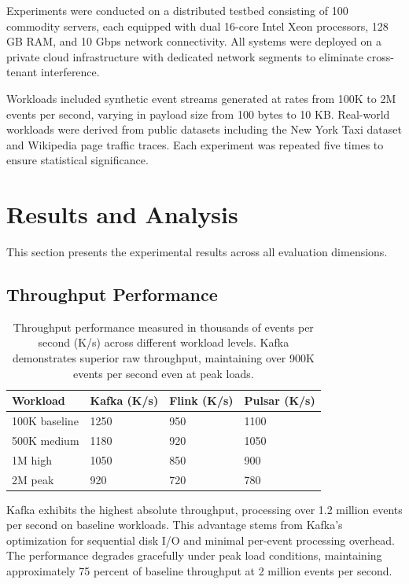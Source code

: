 \documentclass[10pt,twocolumn]{article}
\begin{document}
Experiments were conducted on a distributed testbed consisting of 100 commodity servers, each equipped with dual 16-core Intel Xeon processors, 128 GB RAM, and 10 Gbps network connectivity. All systems were deployed on a private cloud infrastructure with dedicated network segments to eliminate cross-tenant interference.

Workloads included synthetic event streams generated at rates from 100K to 2M events per second, varying in payload size from 100 bytes to 10 KB. Real-world workloads were derived from public datasets including the New York Taxi dataset and Wikipedia page traffic traces. Each experiment was repeated five times to ensure statistical significance.

\section{Results and Analysis}

This section presents the experimental results across all evaluation dimensions.

\subsection{Throughput Performance}

\begin{table}[h]
\centering
\small
\begin{tabularx}{\columnwidth}{|l|X|X|X|}
\toprule
\textbf{Workload} & \textbf{Kafka (K/s)} & \textbf{Flink (K/s)} & \textbf{Pulsar (K/s)} \\
\midrule
100K baseline & 1250 & 950 & 1100 \\
500K medium & 1180 & 920 & 1050 \\
1M high & 1050 & 850 & 900 \\
2M peak & 920 & 720 & 780 \\
\bottomrule
\end{tabularx}
\caption{Throughput performance measured in thousands of events per second (K/s) across different workload levels. Kafka demonstrates superior raw throughput, maintaining over 900K events per second even at peak loads.}
\label{table:throughput}
\end{table}

Kafka exhibits the highest absolute throughput, processing over 1.2 million events per second on baseline workloads. This advantage stems from Kafka's optimization for sequential disk I/O and minimal per-event processing overhead. The performance degrades gracefully under peak load conditions, maintaining approximately 75 percent of baseline throughput at 2 million events per second.
\end{document}
